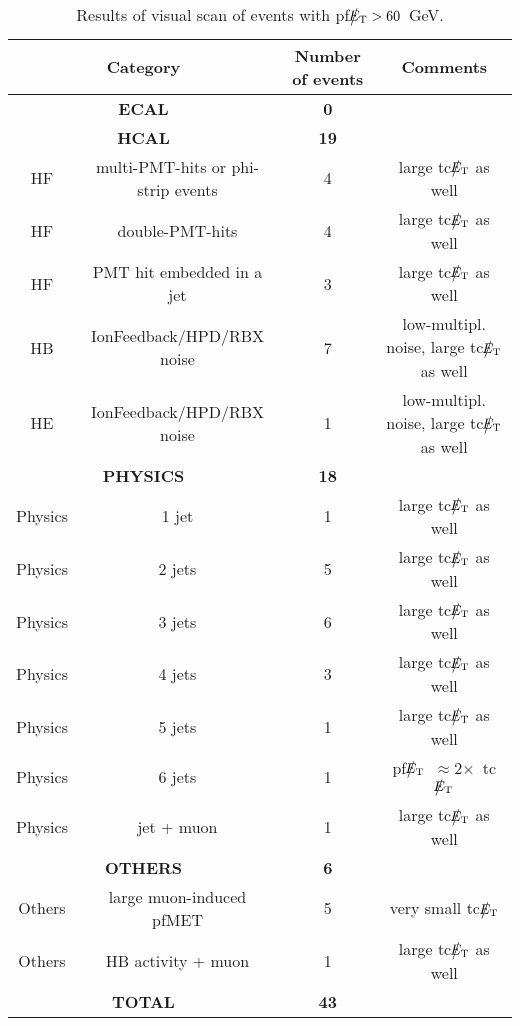 %
%
\begin{table}[htbp]
  \begin{center}
    \begin{tabular}{|c|c|c|c|}
      \hline
      \multicolumn{2}{|c|}{Category} & Number of events  & Comments   \\ 
      \hline\hline
      \multicolumn{2}{|c|}{\bf ECAL} & \bf{0}      &  \\
      \hline    
      \multicolumn{2}{|c|}{\bf HCAL} & \bf{19}      &  \\
      \hline
      HF & multi-PMT-hits or phi-strip events & 4 & large tc$\big\slash\hspace{-1.6ex}{E_\text{T}}$ as well \\           
      HF & double-PMT-hits & 4 & large tc$\big\slash\hspace{-1.6ex}{E_\text{T}}$ as well \\           
      HF & PMT hit embedded in a jet & 3 & large tc$\big\slash\hspace{-1.6ex}{E_\text{T}}$ as well \\           
      HB & IonFeedback/HPD/RBX noise & 7 & low-multipl. noise, large tc$\big\slash\hspace{-1.6ex}{E_\text{T}}$ as well \\           
      HE & IonFeedback/HPD/RBX noise & 1 & low-multipl. noise, large tc$\big\slash\hspace{-1.6ex}{E_\text{T}}$ as well \\           
      \hline    
      \multicolumn{2}{|c|}{\bf PHYSICS} & \bf{18}      &  \\
      \hline
      Physics & 1 jet & 1 & large tc$\big\slash\hspace{-1.6ex}{E_\text{T}}$ as well \\
      Physics & 2 jets & 5 & large tc$\big\slash\hspace{-1.6ex}{E_\text{T}}$ as well \\
      Physics & 3 jets & 6 & large tc$\big\slash\hspace{-1.6ex}{E_\text{T}}$ as well \\
      Physics & 4 jets & 3 & large tc$\big\slash\hspace{-1.6ex}{E_\text{T}}$ as well \\
      Physics & 5 jets & 1 & large tc$\big\slash\hspace{-1.6ex}{E_\text{T}}$ as well\\
      Physics & 6 jets & 1 & pf$\big\slash\hspace{-1.6ex}{E_\text{T}}$~$\approx$2$\times$~tc$\big\slash\hspace{-1.6ex}{E_\text{T}}$\\
      Physics & jet + muon & 1 & large tc$\big\slash\hspace{-1.6ex}{E_\text{T}}$ as well \\ 
      \hline
      \multicolumn{2}{|c|}{\bf OTHERS} & \bf{6}      &  \\
      \hline          
      Others & large muon-induced pfMET & 5 & very small tc$\big\slash\hspace{-1.6ex}{E_\text{T}}$ \\ 
      Others & HB activity + muon & 1 & large tc$\big\slash\hspace{-1.6ex}{E_\text{T}}$ as well \\
      \hline          
      \multicolumn{2}{|c|}{\bf TOTAL} & \bf{43}      &  \\
      \hline
    \end{tabular}
    \caption{Results of visual scan of events with pf$\big\slash\hspace{-1.6ex}{E_\text{T}}>60$~GeV.}    
    \label{tab:pfMETskim}
  \end{center}
\end{table}
